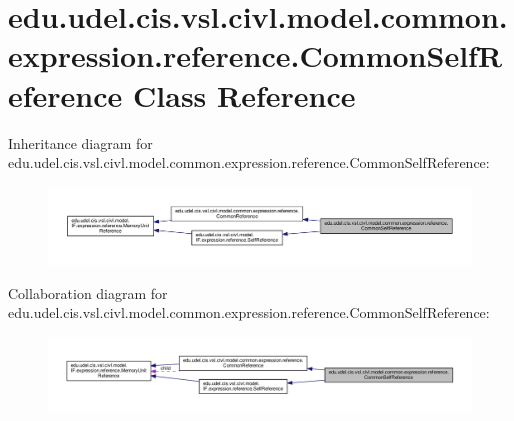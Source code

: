 \hypertarget{classedu_1_1udel_1_1cis_1_1vsl_1_1civl_1_1model_1_1common_1_1expression_1_1reference_1_1CommonSelfReference}{}\section{edu.\+udel.\+cis.\+vsl.\+civl.\+model.\+common.\+expression.\+reference.\+Common\+Self\+Reference Class Reference}
\label{classedu_1_1udel_1_1cis_1_1vsl_1_1civl_1_1model_1_1common_1_1expression_1_1reference_1_1CommonSelfReference}


Inheritance diagram for edu.\+udel.\+cis.\+vsl.\+civl.\+model.\+common.\+expression.\+reference.\+Common\+Self\+Reference\+:
\nopagebreak
\begin{figure}[H]
\begin{center}
\leavevmode
\includegraphics[width=350pt]{classedu_1_1udel_1_1cis_1_1vsl_1_1civl_1_1model_1_1common_1_1expression_1_1reference_1_1CommonSelfReference__inherit__graph}
\end{center}
\end{figure}


Collaboration diagram for edu.\+udel.\+cis.\+vsl.\+civl.\+model.\+common.\+expression.\+reference.\+Common\+Self\+Reference\+:
\nopagebreak
\begin{figure}[H]
\begin{center}
\leavevmode
\includegraphics[width=350pt]{classedu_1_1udel_1_1cis_1_1vsl_1_1civl_1_1model_1_1common_1_1expression_1_1reference_1_1CommonSelfReference__coll__graph}
\end{center}
\end{figure}
